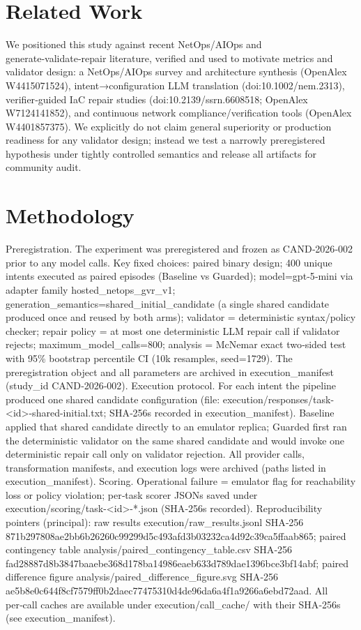 \documentclass[conference]{IEEEtran}
\begin{document}
\section{Related Work}
We positioned this study against recent NetOps/AIOps and generate‑validate‑repair literature, verified and used to motivate metrics and validator design: a NetOps/AIOps survey and architecture synthesis (OpenAlex W4415071524), intent→configuration LLM translation (doi:10.1002/nem.2313), verifier‑guided IaC repair studies (doi:10.2139/ssrn.6608518; OpenAlex W7124141852), and continuous network compliance/verification tools (OpenAlex W4401857375). We explicitly do not claim general superiority or production readiness for any validator design; instead we test a narrowly preregistered hypothesis under tightly controlled semantics and release all artifacts for community audit.

\section{Methodology}
Preregistration. The experiment was preregistered and frozen as CAND‑2026‑002 prior to any model calls. Key fixed choices: paired binary design; 400 unique intents executed as paired episodes (Baseline vs Guarded); model=gpt‑5‑mini via adapter family hosted\_netops\_gvr\_v1; generation\_semantics=shared\_initial\_candidate (a single shared candidate produced once and reused by both arms); validator = deterministic syntax/policy checker; repair policy = at most one deterministic LLM repair call if validator rejects; maximum\_model\_calls=800; analysis = McNemar exact two‑sided test with 95\% bootstrap percentile CI (10k resamples, seed=1729). The preregistration object and all parameters are archived in execution\_manifest (study\_id CAND‑2026‑002). Execution protocol. For each intent the pipeline produced one shared candidate configuration (file: execution/responses/task-<id>-shared-initial.txt; SHA‑256s recorded in execution\_manifest). Baseline applied that shared candidate directly to an emulator replica; Guarded first ran the deterministic validator on the same shared candidate and would invoke one deterministic repair call only on validator rejection. All provider calls, transformation manifests, and execution logs were archived (paths listed in execution\_manifest). Scoring. Operational failure = emulator flag for reachability loss or policy violation; per‑task scorer JSONs saved under execution/scoring/task-<id>-*.json (SHA‑256s recorded). Reproducibility pointers (principal): raw results execution/raw\_results.jsonl SHA‑256 871b297808ae2bb6b26260c99299d5c493afd3b03232ca4d92c39ca5ffaab865; paired contingency table analysis/paired\_contingency\_table.csv SHA‑256 fad28887d8b3847baaebe368d178ba14986eaeb633d789dae1396bce3bf14abf; paired difference figure analysis/paired\_difference\_figure.svg SHA‑256 ae5b8e0c644f8cf7579ff0b2daec77475310d4de96da6a4f1a9266a6ebd72aad. All per‑call caches are available under execution/call\_cache/ with their SHA‑256s (see execution\_manifest).
\end{document}
